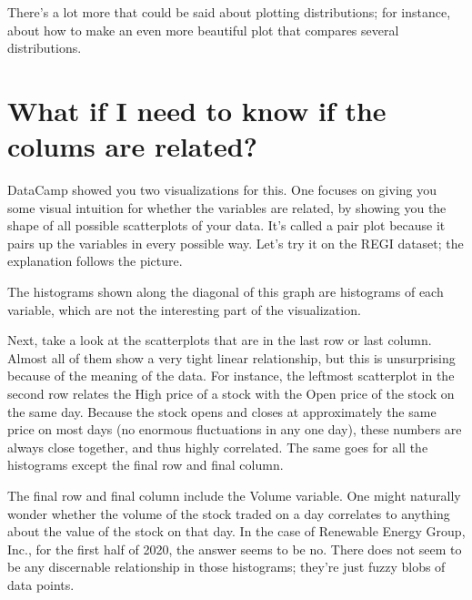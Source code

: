 \documentclass[letterpaper,10pt,english]{sphinxmanual}
\begin{document}
\noindent{}

There’s a lot more that could be said about plotting distributions; for instance,  about how to make an even more beautiful plot that compares several distributions.


\section{What if I need to know if the colums are related?}
\label{\detokenize{chapter-10-visualization:what-if-i-need-to-know-if-the-colums-are-related}}
DataCamp showed you two visualizations for this.  One focuses on giving you some visual intuition for whether the variables are related, by showing you the shape of all possible scatterplots of your data.  It’s called a pair plot because it pairs up the variables in every possible way.  Let’s try it on the REGI dataset; the explanation follows the picture.

\begin{sphinxVerbatim}[commandchars=\\\{\}]
  
\end{sphinxVerbatim}

\noindent{}

The histograms shown along the diagonal of this graph are histograms of each variable, which are not the interesting part of the visualization.

Next, take a look at the scatterplots that are  in the last row or last column.  Almost all of them show a very tight linear relationship, but this is unsurprising because of the meaning of the data.  For instance, the leftmost scatterplot in the second row relates the High price of a stock with the Open price of the stock on the same day.  Because the stock opens and closes at approximately the same price on most days (no enormous fluctuations in any one day), these numbers are always close together, and thus highly correlated.  The same goes for all the histograms except the final row and final column.

The final row and final column include the Volume variable.  One might naturally wonder whether the volume of the stock traded on a day correlates to anything about the value of the stock on that day.  In the case of Renewable Energy Group, Inc., for the first half of 2020, the answer seems to be no.  There does not seem to be any discernable relationship in those histograms; they’re just fuzzy blobs of data points.
\end{document}
